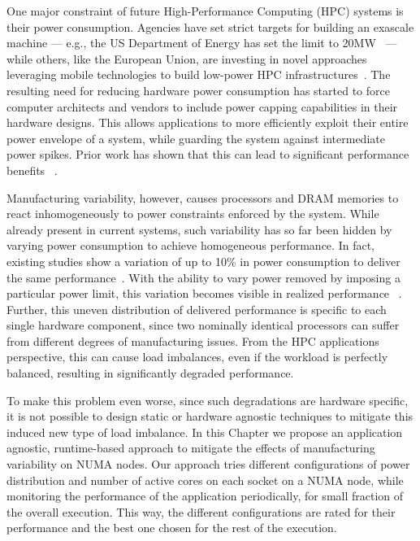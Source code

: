 One major constraint of future High-Performance Computing (HPC) systems is their power
consumption.  Agencies have set strict targets for building an exascale machine --- e.g.,
the US Department of Energy has set the limit to 20MW~\cite{Ashby2010} --- while others,
like the European Union, are investing in novel approaches leveraging mobile technologies
to build low-power HPC infrastructures~\cite{Rajovic2013}.  The resulting need for
reducing hardware power consumption has started to force computer architects and vendors
to include power capping capabilities in their hardware designs.  This allows applications
to more efficiently exploit their entire power envelope of a system, while  guarding the
system against intermediate power spikes. Prior work has shown that this can lead to
significant performance benefits ~\cite{patki:2013:eho:2464996.2465009,conductor2015}.

Manufacturing variability, however, causes  processors and DRAM memories to react
inhomogeneously to power constraints enforced by the system. While already present in
current systems, such variability has so far been hidden by varying power consumption to
achieve homogeneous performance.  In fact, existing studies show a variation of up to 10\%
in power consumption to deliver the same performance~\cite{Rountree2012}. With the ability
to vary power removed by imposing a particular power limit, this variation becomes visible
in realized performance ~\cite{Inadomi:2015:AMI:2807591.2807638}.  Further, this uneven
distribution of delivered performance is specific to each single hardware component, since
two nominally identical processors can suffer from different degrees of manufacturing
issues.  From the HPC applications perspective, this can cause load imbalances, even if
the workload is perfectly balanced, resulting in significantly degraded performance.

To make this problem even worse, since such degradations are hardware specific, it is not
possible to design static or hardware agnostic techniques to mitigate this induced new
type of load imbalance. In this Chapter we propose an application agnostic, runtime-based
approach to mitigate the effects of manufacturing variability on NUMA nodes.  Our approach
tries different configurations of power distribution and number of active cores on each
socket on a NUMA node, while monitoring the performance of the application periodically,
for small fraction of the overall execution.  This way, the different configurations are
rated for their performance and the best one chosen for the rest of the execution.

